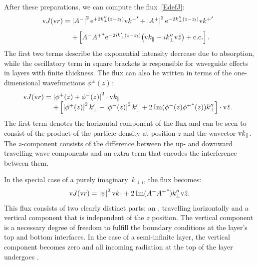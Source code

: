 After these preparations,
we can compute the flux~\cref{EdefJ}:
\begin{equation}\label{EJ1}
  \begin{array}{@{}l@{\;}l}
  \v{J}(\r)
  =&   \left|A^-\right|^2 \e^{+2k_\perp'' (z-z_l)} {\k^-}'
    + \left|A^+\right|^2 \e^{-2k_\perp''(z-z_l)} {\k^+}'
\\[2ex]
  &+ \left[
      A^-{A^+}^* \e^{-2ik_\perp'(z-z_l)} {\left(\k_\plll-ik_\perp''\v{\hat z}\right)}
    + \text{c.c.}
    \right].
  \end{array}
\end{equation}
The first two terms describe the exponential intensity decrease
due to absorption, while
the oscillatory term in square brackets
is responsible for waveguide effects in layers with finite thickness.
The flux can also be written in terms of the one-dimensional wavefunctions $\phi^{\pm}(z)$:
\begin{equation}\label{EJ2}
  \begin{array}{@{}l@{\;}l}
  \v{J}(\r) =& \left|\phi^+(z)+\phi^-(z)\right|^2\cdot\k_\plll \\
  &+ \left[ \left|\phi^+(z)\right|^2 k_\perp' - \left|\phi^-(z)\right|^2 k_\perp' +
  2\Im(\phi^-(z){\phi^+}^*(z))k_\perp'' \right]\cdot \v{\hat z}.
  \end{array}
\end{equation}
The first term denotes the horizontal component
of the flux and can be seen to consist of the product
of the particle density at position $z$ and the wavector $\text{v}{k}_\parallel$.
The $z$-component consists of the difference
between the up- and downward travelling wave components
and an extra term that encodes the interference between them.

In the special case of a purely imaginary~$k_{\perp l}$,
the flux becomes:
\begin{equation}\label{EJ3}
  \text{v}{J}(\text{v}{r}) = \left| \psi \right|^2 \text{v}{k}_\parallel + 2 \operatorname{Im} (A^-{A^+}^*) k_\perp''\text{v}{\hat z}.
\end{equation}
This flux consists of two clearly distinct parts: an ,
%
travelling horizontally
 and a vertical component that is independent of the $z$ position.
The vertical component is a necessary
 degree of freedom to fulfill the boundary conditions at the layer's top and bottom interfaces.
In the case of a semi-infinite layer, the vertical component becomes zero and
 all incoming radiation at the top of the layer undergoes .
%

